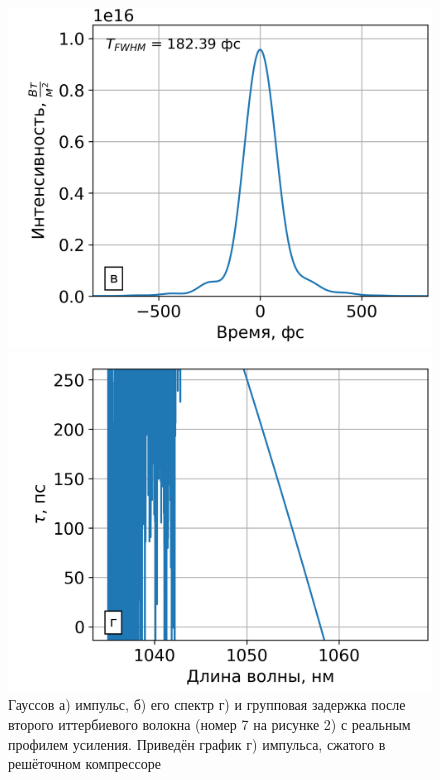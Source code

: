 \documentclass[12pt]{article}
\begin{document}
\begin{figure}[h!]
  \vspace{}

  \begin{minipage}[b]{0.5\textwidth}
    \includegraphics[width=\linewidth]{Images/Gauss Pulse/После компрессора/14 элемент gamma=49.71717 l_g=0.37698 сжатие}
  \end{minipage}%
  \begin{minipage}[b]{0.5\textwidth}
    \includegraphics[width=\linewidth]{Images/Gauss Pulse/Импульс и спектр/!14. Yb3+ 6_125, 0.8m_time_delay}
  \end{minipage}

  \caption{Гауссов а) импульс, б) его спектр г) и групповая задержка после второго иттербиевого волокна (номер 7 на
  рисунке 2) с реальным профилем усиления. Приведён график г) импульса, сжатого в решёточном компрессоре}
  \label{fig:both}
\end{figure}
\end{document}
